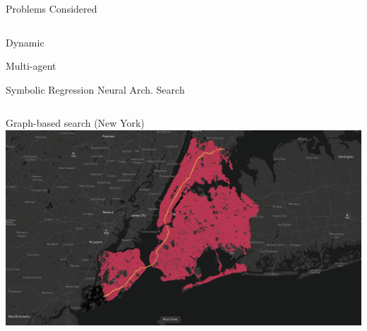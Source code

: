 \documentclass[aspectratio=169]{beamer}
\makeatletter
\renewcommand{\white}[1]{{\color{pureminimalistic@text@white} #1}}
\makeatother
\begin{document}
\begin{frame}[plain]{\white{Problems Considered}}
\begin{columns}[T]
\begin{column}{.5\linewidth}
\begin{vfilleditems}
              \vspace{1em}
              \item {\color{grey} {\Large Dynamic}}
              \vspace{1em}
              \item {\color{grey} {\Large Multi-agent}}
          \end{vfilleditems}
          \vspace{1em}
          {\color{grey} {\Large Symbolic Regression}}
          \vspace{1em}
          {\color{grey} {\Large Neural Arch. Search}}
      \end{column}
  \end{columns}
\end{frame}

\begin{frame}[plain]{Graph-based search \white{(New York)}}
    \includegraphics[width=1.0\linewidth, keepaspectratio, trim={0cm, 2cm, 1cm, 0.5cm}, clip]{figures/ny_graph_based.png}
\end{frame}
\end{document}
